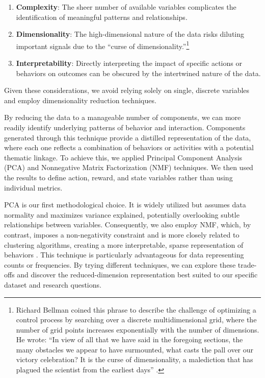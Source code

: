 \documentclass[
  number,
  preprint,
  3p,
  onecolumn]{elsarticle}
\providecommand{\tightlist}{%
  \setlength{\itemsep}{0pt}\setlength{\parskip}{0pt}}\usepackage{longtable,booktabs,array}
\begin{document}
\begin{enumerate}
\def\labelenumi{\arabic{enumi}.}
\tightlist
\item
  \textbf{Complexity}: The sheer number of available variables
  complicates the identification of meaningful patterns and
  relationships.
\item
  \textbf{Dimensionality}: The high-dimensional nature of the data risks
  diluting important signals due to the ``curse of
  dimensionality.''\footnote{Richard Bellman coined this phrase to
    describe the challenge of optimizing a control process by searching
    over a discrete multidimensional grid, where the number of grid
    points increases exponentially with the number of dimensions. He
    wrote: ``In view of all that we have said in the foregoing sections,
    the many obstacles we appear to have surmounted, what casts the pall
    over our victory celebration? It is the curse of dimensionality, a
    malediction that has plagued the scientist from the earliest days''
    \citep{bellman2015adaptive}.}
\item
  \textbf{Interpretability}: Directly interpreting the impact of
  specific actions or behaviors on outcomes can be obscured by the
  intertwined nature of the data.
\end{enumerate}

Given these considerations, we avoid relying solely on single, discrete
variables and employ dimensionality reduction techniques.

By reducing the data to a manageable number of components, we can more
readily identify underlying patterns of behavior and interaction.
Components generated through this technique provide a distilled
representation of the data, where each one reflects a combination of
behaviors or activities with a potential thematic linkage. To achieve
this, we applied Principal Component Analysis (PCA) and Nonnegative
Matrix Factorization (NMF) techniques. We then used the results to
define action, reward, and state variables rather than using individual
metrics.

PCA is our first methodological choice. It is widely utilized but
assumes data normality \citep{jolliffe2016} and maximizes variance
explained, potentially overlooking subtle relationships between
variables. Consequently, we also employ NMF, which, by contrast, imposes
a non-negativity constraint and is more closely related to clustering
algorithms, creating a more interpretable, sparse representation of
behaviors \citep{ding2005, lee1999}. This technique is particularly
advantageous for data representing counts or frequencies. By trying
different techniques, we can explore these trade-offs and discover the
reduced-dimension representation best suited to our specific dataset and
research questions.
\end{document}
